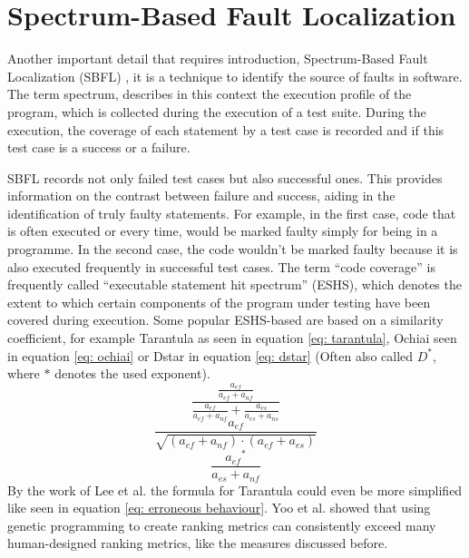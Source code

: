 \section{Spectrum-Based Fault Localization}\label{sec:spectrum-analysis}
Another important detail that requires introduction, Spectrum-Based Fault Localization (SBFL) \cite{wong_handbook_2023}, it is a technique to identify the source of faults in software.
The term spectrum, describes in this context the execution profile of the program, which is collected during the execution of a test suite.
During the execution, the coverage of each statement by a test case is recorded and if this test case is a success or a failure.

SBFL records not only failed test cases but also successful ones.
This provides information on the contrast between failure and success, aiding in the identification of truly faulty statements.
For example, in the first case, code that is often executed or every time, would be marked faulty simply for being in a programme.
In the second case, the code wouldn't be marked faulty because it is also executed frequently in successful test cases.
The term “code coverage” is frequently called “executable statement hit spectrum” (ESHS), which denotes the extent to which certain components of the program under testing have been covered during execution.
Some popular ESHS-based are based on a similarity coefficient, for example Tarantula \cite{jones_empirical_2005} as seen in equation \ref{eq: tarantula}, Ochiai \cite{ochiai_zoogeographical_1957} seen in equation \ref{eq: ochiai} or Dstar \cite{wong_dstar_2014} in equation \ref{eq: dstar} (Often also called $D^*$, where $*$ denotes the used exponent).
\begin{equation}
    \frac{\frac{a_{ef}}{a_{ef} + a_{nf}}}{\frac{a_{ef}}{a_{ef} + a_{nf}}+\frac{a_{es}}{a_{es} + a_{ns}}}
    \label{eq: tarantula}
\end{equation}
\begin{equation}
    \frac{a_{ef}}{\sqrt{(a_{ef}+a_{nf})\cdot(a_{ef}+a_{es})}}
    \label{eq: ochiai}
\end{equation}
\begin{equation}
    \frac{{a_{ef}}^*}{a_{es}+a_{nf}}
    \label{eq: dstar}
\end{equation}
By the work of Lee et al. \cite{hua_jie_lee_study_2009} the formula for Tarantula could even be more simplified like seen in equation \ref{eq: erroneous behaviour}.
Yoo et al. \cite{yoo_human_2017} showed that using genetic programming to create ranking metrics can consistently exceed many human-designed ranking metrics, like the measures discussed before.
